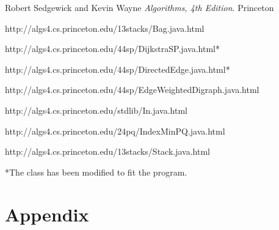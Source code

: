 \documentclass[a4paper,10pt,titlepage]{article}
\begin{document}
	\begin{thebibliography}{9}
  	Robert Sedgewick and Kevin Wayne
  	\emph{Algorithms, 4th Edition}.
  	Princeton

	http://algs4.cs.princeton.edu/13stacks/Bag.java.html
	
	http://algs4.cs.princeton.edu/44sp/DijkstraSP.java.html*  	
	
	http://algs4.cs.princeton.edu/44sp/DirectedEdge.java.html*
	
	http://algs4.cs.princeton.edu/44sp/EdgeWeightedDigraph.java.html
  	
	http://algs4.cs.princeton.edu/stdlib/In.java.html
	
	http://algs4.cs.princeton.edu/24pq/IndexMinPQ.java.html
	
	 												http://algs4.cs.princeton.edu/13stacks/Stack.java.html
	
	\end{thebibliography}
	*The class has been modified to fit the program.

	\section{Appendix}
\end{document}

